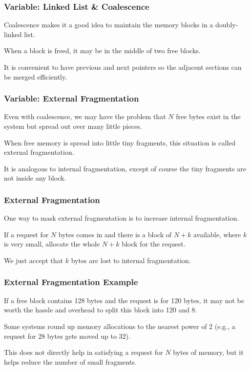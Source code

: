 \begin{frame}
\frametitle{Variable: Linked List \& Coalescence}

Coalescence makes it a good idea to maintain the memory blocks in a doubly-linked list.

When a block is freed, it may be in the middle of two free blocks. 

It is convenient to have previous and next pointers so the adjacent sections can be merged efficiently.


\end{frame}

\begin{frame}
\frametitle{Variable: External Fragmentation}

Even with coalescence, we may have the problem that $N$ free bytes exist in the system but spread out over many little pieces.

When free memory is spread into little tiny fragments, this situation is called \alert{external fragmentation}. 

It is analogous to internal fragmentation, except of course the tiny fragments are not inside any block.


\end{frame}

\begin{frame}
\frametitle{External Fragmentation}

One way to mask external fragmentation is to increase internal fragmentation.

If a request for $N$ bytes comes in and there is a block of $N+k$ available, where $k$ is very small, allocate the whole $N+k$ block for the request.

We just accept that $k$ bytes are lost to internal fragmentation.

\end{frame}

\begin{frame}
\frametitle{External Fragmentation Example}

If a free block contains 128 bytes and the request is for 120 bytes, it may not be worth the hassle and overhead to split this block into 120 and 8. 

Some systems round up memory allocations to the nearest power of 2 (e.g., a request for 28 bytes gets moved up to 32). 

This does not directly help in satisfying a request for $N$ bytes of memory, but it helps reduce the number of small fragments.

\end{frame}

